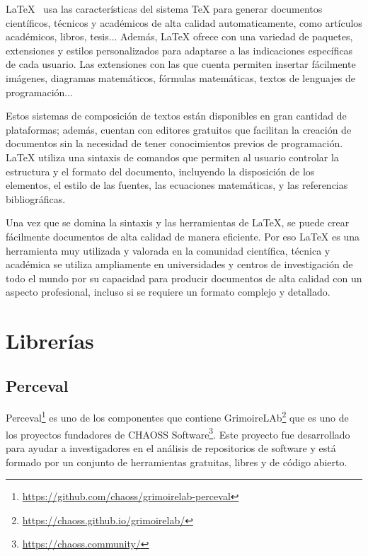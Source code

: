 \documentclass[a4paper, 12pt]{book}
\begin{document}
LaTeX~\cite{rodriguez2014edicion} usa las características del sistema TeX para generar documentos científicos, técnicos y académicos de alta calidad automaticamente, como artículos académicos, libros, tesis...   
Además, LaTeX ofrece con una variedad de paquetes, extensiones y estilos personalizados para adaptarse a las indicaciones específicas de cada usuario.
Las extensiones con las que cuenta permiten insertar fácilmente imágenes, diagramas matemáticos, fórmulas matemáticas, textos de lenguajes de programación...


Estos sistemas de composición de textos están disponibles en gran cantidad de plataformas; además, cuentan con editores gratuitos que facilitan la creación de documentos sin la necesidad de tener conocimientos previos de programación.
LaTeX utiliza una sintaxis de comandos que permiten al usuario controlar la estructura y el formato del documento, incluyendo la disposición de los elementos, el estilo de las fuentes, las ecuaciones matemáticas, y las referencias bibliográficas. 


Una vez que se domina la sintaxis y las herramientas de LaTeX, se puede crear fácilmente documentos de alta calidad de manera eficiente.
Por eso LaTeX es una herramienta muy utilizada y valorada en la comunidad científica, técnica y académica se utiliza ampliamente en universidades y centros de investigación de todo el mundo por su capacidad para producir documentos de alta calidad con un aspecto profesional, incluso si se requiere un formato complejo y detallado. 


\section{Librerías} %
\label{sec:librerías}

\subsection{Perceval} %
\label{sec:perceval} %


Perceval\footnote{\url{https://github.com/chaoss/grimoirelab-perceval}} es uno de los componentes que contiene GrimoireLAb\footnote{\url{https://chaoss.github.io/grimoirelab/}} que es uno de los proyectos fundadores de CHAOSS Software\footnote{\url{https://chaoss.community/}}.
Este proyecto fue desarrollado para ayudar a investigadores en el análisis de repositorios de software y está formado por un conjunto de herramientas gratuitas, libres y de código abierto. 
\end{document}
